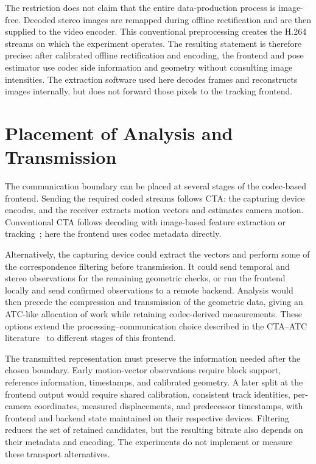 The restriction does not claim that the entire data-production process is
image-free. Decoded stereo images are remapped during offline rectification and
are then supplied to the video encoder. This conventional preprocessing creates
the H.264 streams on which the experiment operates. The resulting statement is
therefore precise: after calibrated offline rectification and encoding,
the frontend and pose estimator use codec side information and geometry without
consulting image intensities. The extraction software used here decodes frames
and reconstructs images internally, but does not forward those pixels to the
tracking frontend.

\section{Placement of Analysis and Transmission}\label{sec:cta-compatibility}

The communication boundary can be placed at several stages of the codec-based
frontend. Sending the required coded streams follows CTA: the capturing device
encodes, and the receiver extracts motion vectors and estimates camera motion.
Conventional CTA follows decoding with image-based feature extraction or
tracking~\cite{hofer2023h264cta}; here the frontend uses codec metadata directly.

Alternatively, the capturing device could extract the vectors and perform some
of the correspondence filtering before transmission. It could send temporal
and stereo observations for the remaining geometric checks, or run the frontend
locally and send confirmed observations to a remote backend. Analysis would then
precede the compression and transmission of the geometric data, giving an
ATC-like allocation of work while retaining codec-derived measurements. These
options extend the processing--communication choice described in the CTA--ATC
literature~\cite{redondi2016cta} to different stages of this frontend.

The transmitted representation must preserve the information needed after the
chosen boundary. Early motion-vector observations require block support,
reference information, timestamps, and calibrated geometry. A later split at
the frontend output would require shared calibration, consistent track identities,
per-camera coordinates, measured displacements, and predecessor timestamps,
with frontend and backend state maintained on their respective devices.
Filtering reduces the set of retained candidates, but the resulting bitrate also
depends on their metadata and encoding. The experiments do not implement or
measure these transport alternatives.

